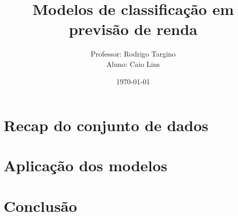 \documentclass[a4paper, 12pt]{article}
\title{Modelos de classificação em previsão de renda}
\author{Professor: Rodrigo Targino \\
        Aluno: Caio Lins}
\date{\today}
\begin{document}
\maketitle

\tableofcontents

\section{Recap do conjunto de dados}


\section{Aplicação dos modelos}




\section{Conclusão}
\end{document}
